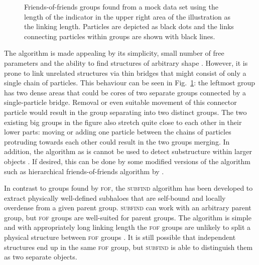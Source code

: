 \documentclass[english, twoside]{HYgradu}
\begin{document}
\begin{figure}
    \centering
    
    \caption{Friends-of-friends groups found from a mock data set using the length of the indicator in the upper right area of the illustration as the linking length. Particles are depicted as black dots and the links connecting particles within groups are shown with black lines.}\label{fig:fof}
\end{figure}

The algorithm is made appealing by its simplicity, small number of free parameters and the ability to find structures of arbitrary shape \citep{davis1985evolution}. However, it is prone to link unrelated structures via thin bridges that might consist of only a single chain of particles. This behaviour can be seen in Fig.\ \ref{fig:fof}: the leftmost group has two dense areas that could be cores of two separate groups connected by a single-particle bridge. Removal or even suitable movement of this connector particle would result in the group separating into two distinct groups. The two existing big groups in the figure also stretch quite close to each other in their lower parts: moving or adding one particle between the chains of particles protruding towards each other could result in the two groups merging. In addition, the algorithm as is cannot be used to detect substructure within larger objects \citep{springel2001populating}. If desired, this can be done by some modified versions of the algorithm such as hierarchical friends-of-friends algorithm by \citet{Gottlober1999halo}.

In contrast to groups found by \textsc{fof}, the \textsc{subfind} algorithm has been developed to extract physically well-defined subhaloes that are self-bound and locally overdense from a given parent group. \textsc{subfind} can work with an arbitrary parent group, but \textsc{fof} groups are well-suited for parent groups. The algorithm is simple and with appropriately long linking length the \textsc{fof} groups are unlikely to split a physical structure between \textsc{fof} groups \citep{springel2001populating}. It is still possible that independent structures end up in the same \textsc{fof} group, but \textsc{subfind} is able to distinguish them as two separate objects.
\end{document}
